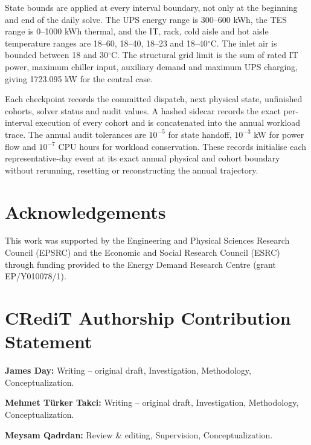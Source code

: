 State bounds are applied at every interval boundary, not only at the beginning
and end of the daily solve. The UPS energy range is 300--600 kWh, the TES range
is 0--1000 kWh thermal, and the IT, rack, cold aisle and hot aisle temperature
ranges are 18--60, 18--40, 18--23 and 18--40$^{\circ}$C. The inlet air is
bounded between 18 and 30$^{\circ}$C. The structural grid limit is the sum of
rated IT power, maximum chiller input, auxiliary demand and maximum UPS charging,
giving 1723.095 kW for the central case.

Each checkpoint records the committed dispatch, next physical state, unfinished
cohorts, solver status and audit values. A hashed sidecar records the exact
per-interval execution of every cohort and is concatenated into the annual
workload trace. The annual audit tolerances are
$10^{-5}$ for state handoff, $10^{-3}$ kW for power flow and
$10^{-7}$ CPU hours for workload conservation. These records initialise each
representative-day event at its exact annual physical and cohort boundary without
rerunning, resetting or reconstructing the annual trajectory.




\section*{Acknowledgements}

This work was supported by the Engineering and Physical Sciences Research
Council (EPSRC) and the Economic and Social Research Council (ESRC) through
funding provided to the Energy Demand Research Centre (grant EP/Y010078/1).

\section*{CRediT Authorship Contribution Statement}

\noindent \textbf{James Day:} Writing -- original draft, Investigation,
Methodology, Conceptualization.

\medskip
\noindent \textbf{Mehmet T{\"u}rker Takci:} Writing -- original draft,
Investigation, Methodology, Conceptualization.

\medskip
\noindent \textbf{Meysam Qadrdan:} Review \& editing, Supervision,
Conceptualization.
